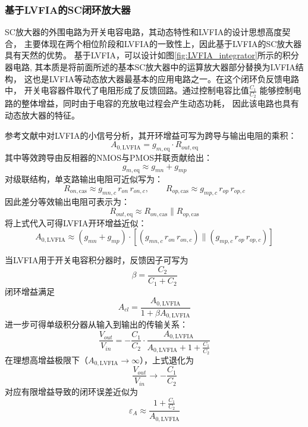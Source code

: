 \subsubsection{基于LVFIA的SC闭环放大器}
SC放大器的外围电路为开关电容电路，其动态特性和LVFIA的设计思想高度契合，
主要体现在两个相位阶段和LVFIA的一致性上，因此基于LVFIA的SC放大器具有天然的优势。
基于LVFIA，可以设计如图\ref{fig:LVFIA_integrator}所示的积分器电路,
其本质是将前面所述的基本SC放大器中的运算放大器部分替换为LVFIA结构，
这也是LVFIA等动态放大器最基本的应用电路之一。在这个闭环负反馈电路中，
开关电容器件取代了电阻形成了反馈回路。通过控制电容比值${\frac{C_1}{C_2} }$
能够控制电路的整体增益，同时由于电容的充放电过程会产生动态功耗，
因此该电路也具有动态放大器的特征。
\par
参考文献\cite{wu2025lvfia}中对LVFIA的小信号分析，其开环增益可写为跨导与输出电阻的乘积：
\begin{equation}
    A_{0,\mathrm{LVFIA}} = g_{m,\mathrm{eq}} \cdot R_{out,\mathrm{eq}}
\end{equation}
其中等效跨导由反相器的NMOS与PMOS并联贡献给出：
\begin{equation}
    g_{m,\mathrm{eq}} \approx g_{mn}+g_{mp}
\end{equation}
对级联结构，单支路输出电阻可近似写为：
\begin{equation}
    R_{on,\mathrm{cas}} \approx g_{mn,c}\,r_{on}\,r_{on,c},\qquad
    R_{op,\mathrm{cas}} \approx g_{mp,c}\,r_{op}\,r_{op,c}
\end{equation}
因此差分等效输出电阻可表示为：
\begin{equation}
    R_{out,\mathrm{eq}} \approx R_{on,\mathrm{cas}} \parallel R_{op,\mathrm{cas}}
\end{equation}
将上式代入可得LVFIA开环增益近似：
\begin{equation}
    A_{0,\mathrm{LVFIA}} \approx (g_{mn}+g_{mp})\cdot
    \left[\left(g_{mn,c}\,r_{on}\,r_{on,c}\right)\parallel
    \left(g_{mp,c}\,r_{op}\,r_{op,c}\right)\right]
\end{equation}

当LVFIA用于开关电容积分器时，反馈因子可写为
\begin{equation}
    \beta=\frac{C_2}{C_1+C_2}
\end{equation}
闭环增益满足
\begin{equation}
    A_{cl}=\frac{A_{0,\mathrm{LVFIA}}}{1+\beta A_{0,\mathrm{LVFIA}}}
\end{equation}
进一步可得单级积分器从输入到输出的传输关系：
\begin{equation}
    \frac{V_{out}}{V_{in}}
    =-\frac{C_1}{C_2}\cdot
    \frac{A_{0,\mathrm{LVFIA}}}{A_{0,\mathrm{LVFIA}}+1+\frac{C_1}{C_2}}
\end{equation}
在理想高增益极限下（$A_{0,\mathrm{LVFIA}}\rightarrow\infty$），上式退化为
\begin{equation}
    \frac{V_{out}}{V_{in}} \rightarrow -\frac{C_1}{C_2}
\end{equation}
对应有限增益导致的闭环误差近似为
\begin{equation}
    \varepsilon_A
    \approx \frac{1+\frac{C_1}{C_2}}{A_{0,\mathrm{LVFIA}}}
\end{equation}



